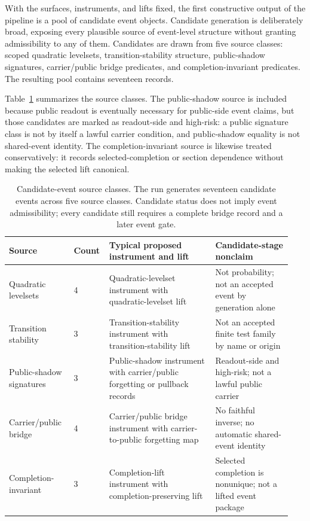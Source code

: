 \documentclass[11pt]{article}
\theoremstyle{definition}
\begin{document}
With the surfaces, instruments, and lifts fixed, the first constructive output of the pipeline is a pool of candidate event objects. Candidate generation is deliberately broad, exposing every plausible source of event-level structure without granting admissibility to any of them. Candidates are drawn from five source classes: scoped quadratic levelsets, transition-stability structure, public-shadow signatures, carrier/public bridge predicates, and completion-invariant predicates. The resulting pool contains seventeen records.

Table~\ref{tab:candidate-event-sources} summarizes the source classes. The public-shadow source is included because public readout is eventually necessary for public-side event claims, but those candidates are marked as readout-side and high-risk: a public signature class is not by itself a lawful carrier condition, and public-shadow equality is not shared-event identity. The completion-invariant source is likewise treated conservatively: it records selected-completion or section dependence without making the selected lift canonical.

\begin{table}[t]
\centering
\small
\setlength{\tabcolsep}{4pt}
\begin{tabular}{p{0.22\linewidth}p{0.10\linewidth}p{0.36\linewidth}p{0.26\linewidth}}
\hline
\textbf{Source} & \textbf{Count} & \textbf{Typical proposed instrument and lift} & \textbf{Candidate-stage nonclaim} \\
\hline
Quadratic levelsets
&
4
&
Quadratic-levelset instrument with quadratic-levelset lift
&
Not probability; not an accepted event by generation alone
\\[0.4em]
Transition stability
&
3
&
Transition-stability instrument with transition-stability lift
&
Not an accepted finite test family by name or origin
\\[0.4em]
Public-shadow signatures
&
3
&
Public-shadow instrument with carrier/public forgetting or pullback records
&
Readout-side and high-risk; not a lawful public carrier
\\[0.4em]
Carrier/public bridge
&
4
&
Carrier/public bridge instrument with carrier-to-public forgetting map
&
No faithful inverse; no automatic shared-event identity
\\[0.4em]
Completion-invariant
&
3
&
Completion-lift instrument with completion-preserving lift
&
Selected completion is nonunique; not a lifted event package
\\
\hline
\end{tabular}
\caption{Candidate-event source classes. The run generates seventeen candidate events across five source classes. Candidate status does not imply event admissibility; every candidate still requires a complete bridge record and a later event gate.}
\label{tab:candidate-event-sources}
\end{table}
\end{document}

